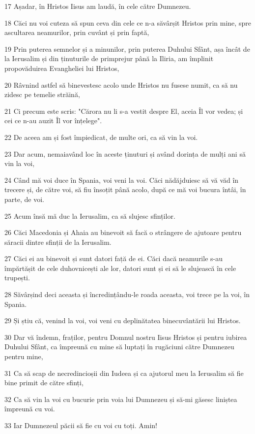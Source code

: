 \par 17 Așadar, în Hristos Iisus am laudă, în cele către Dumnezeu.
\par 18 Căci nu voi cuteza să spun ceva din cele ce n-a săvârșit Hristos prin mine, spre ascultarea neamurilor, prin cuvânt și prin faptă,
\par 19 Prin puterea semnelor și a minunilor, prin puterea Duhului Sfânt, așa încât de la Ierusalim și din ținuturile de primprejur până la Iliria, am împlinit propovăduirea Evangheliei lui Hristos,
\par 20 Râvnind astfel să binevestesc acolo unde Hristos nu fusese numit, ca să nu zidesc pe temelie străină,
\par 21 Ci precum este scris: "Cărora nu li s-a vestit despre El, aceia Îl vor vedea; și cei ce n-au auzit Îl vor înțelege".
\par 22 De aceea am și fost împiedicat, de multe ori, ca să vin la voi.
\par 23 Dar acum, nemaiavând loc în aceste ținuturi și având dorința de mulți ani să vin la voi,
\par 24 Când mă voi duce în Spania, voi veni la voi. Căci nădăjduiesc să vă văd în trecere și, de către voi, să fiu însoțit până acolo, după ce mă voi bucura întâi, în parte, de voi.
\par 25 Acum însă mă duc la Ierusalim, ca să slujesc sfinților.
\par 26 Căci Macedonia și Ahaia au binevoit să facă o strângere de ajutoare pentru săracii dintre sfinții de la Ierusalim.
\par 27 Căci ei au binevoit și sunt datori față de ei. Căci dacă neamurile s-au împărtășit de cele duhovnicești ale lor, datori sunt și ei să le slujească în cele trupești.
\par 28 Săvârșind deci aceasta și încredințându-le roada aceasta, voi trece pe la voi, în Spania.
\par 29 Și știu că, venind la voi, voi veni cu deplinătatea binecuvântării lui Hristos.
\par 30 Dar vă îndemn, fraților, pentru Domnul nostru Iisus Hristos și pentru iubirea Duhului Sfânt, ca împreună cu mine să luptați în rugăciuni către Dumnezeu pentru mine,
\par 31 Ca să scap de necredincioșii din Iudeea și ca ajutorul meu la Ierusalim să fie bine primit de către sfinți,
\par 32 Ca să vin la voi cu bucurie prin voia lui Dumnezeu și să-mi găsesc liniștea împreună cu voi.
\par 33 Iar Dumnezeul păcii să fie cu voi cu toți. Amin!

